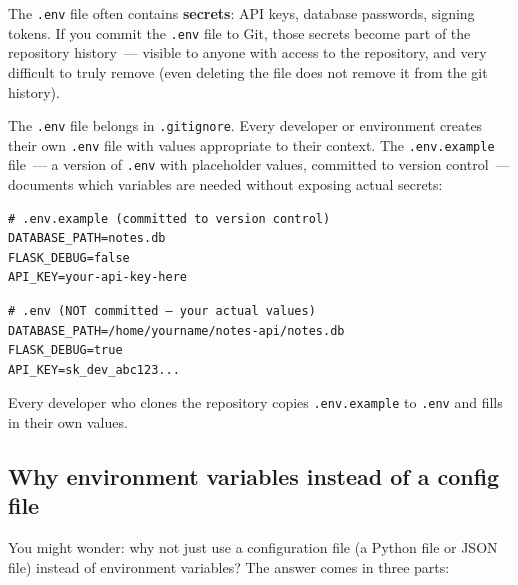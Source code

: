 The \texttt{.env} file often contains \textbf{secrets}: API keys, database passwords, signing tokens. If you commit the \texttt{.env} file to Git, those secrets become part of the repository history~--- visible to anyone with access to the repository, and very difficult to truly remove (even deleting the file does not remove it from the git history).

The \texttt{.env} file belongs in \texttt{.gitignore}. Every developer or environment creates their own \texttt{.env} file with values appropriate to their context. The \texttt{.env.example} file~--- a version of \texttt{.env} with placeholder values, committed to version control~--- documents which variables are needed without exposing actual secrets:

\begin{outputbox}[short]
\begin{Verbatim}[fontsize=\codesize, breaklines, breakanywhere, breaksymbolleft={\tiny\textcolor{muted}{$\hookrightarrow$}}]
# .env.example (committed to version control)
DATABASE_PATH=notes.db
FLASK_DEBUG=false
API_KEY=your-api-key-here
\end{Verbatim}
\end{outputbox}

\begin{outputbox}[short]
\begin{Verbatim}[fontsize=\codesize, breaklines, breakanywhere, breaksymbolleft={\tiny\textcolor{muted}{$\hookrightarrow$}}]
# .env (NOT committed — your actual values)
DATABASE_PATH=/home/yourname/notes-api/notes.db
FLASK_DEBUG=true
API_KEY=sk_dev_abc123...
\end{Verbatim}
\end{outputbox}

\noindent{}Every developer who clones the repository copies \texttt{.env.example} to \texttt{.env} and fills in their own values.

\subsection*{Why environment variables instead of a config file}\label{06-local-dependencies:why-environment-variables-instead-of-a-config-file}

You might wonder: why not just use a configuration file (a Python file or JSON file) instead of environment variables? The answer comes in three parts:

